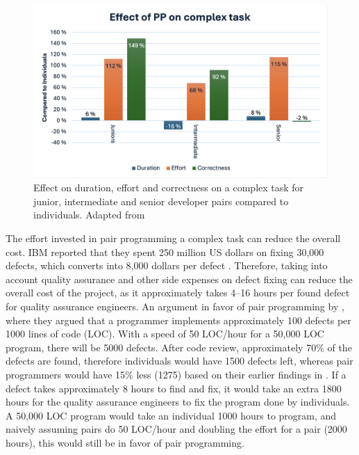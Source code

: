\documentclass[conference]{IEEEtran}
\begin{document}
\begin{figure}
    \centering
    \includegraphics[width=\linewidth]{complex.png}
    \caption{Effect on duration, effort and correctness on a complex task for junior, intermediate and senior developer pairs compared to individuals. Adapted from \cite{Arisholm2007Evaluating}}
    \label{fig:complex}
\end{figure}

The effort invested in pair programming a complex task can reduce the overall cost. IBM reported that they spent 250 million US dollars on fixing 30,000 defects, which converts into 8,000 dollars per defect \cite{10.5555/377517.377531}. Therefore, taking into account quality assurance and other side expenses on defect fixing can reduce the overall cost of the project, as it approximately takes 4--16 hours per found defect for quality assurance engineers. An argument in favor of pair programming by \cite{10.5555/377517.377531}, where they argued that a programmer implements approximately 100 defects per 1000 lines of code (LOC). With a speed of 50 LOC/hour for a 50,000 LOC program, there will be 5000 defects. After code review, approximately 70\% of the defects are found, therefore individuals would have 1500 defects left, whereas pair programmers would have 15\% less (1275) based on their earlier findings in \cite{Williams2000Strengthening}. If a defect takes approximately 8 hours to find and fix, it would take an extra 1800 hours for the quality assurance engineers to fix the program done by individuals. A 50,000 LOC program would take an individual 1000 hours to program, and naively assuming pairs do 50 LOC/hour and doubling the effort for a pair (2000 hours), this would still be in favor of pair programming. 
\end{document}

